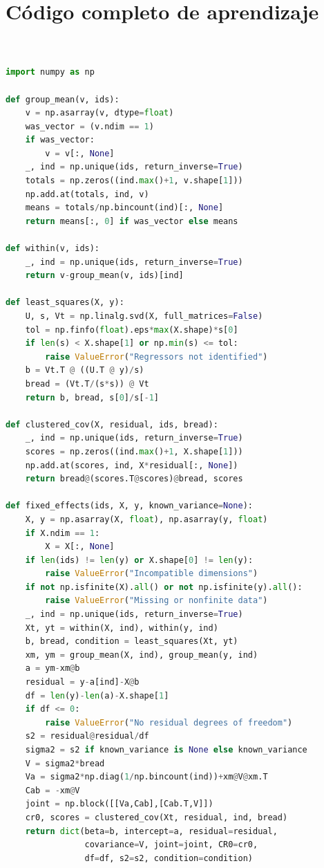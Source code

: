\documentclass[11pt,a4paper]{article}
\theoremstyle{definition}
\begin{document}
\section{Código completo de aprendizaje}
\begin{lstlisting}[language=Python]


import numpy as np

def group_mean(v, ids):
    v = np.asarray(v, dtype=float)
    was_vector = (v.ndim == 1)
    if was_vector:
        v = v[:, None]
    _, ind = np.unique(ids, return_inverse=True)
    totals = np.zeros((ind.max()+1, v.shape[1]))
    np.add.at(totals, ind, v)
    means = totals/np.bincount(ind)[:, None]
    return means[:, 0] if was_vector else means

def within(v, ids):
    _, ind = np.unique(ids, return_inverse=True)
    return v-group_mean(v, ids)[ind]

def least_squares(X, y):
    U, s, Vt = np.linalg.svd(X, full_matrices=False)
    tol = np.finfo(float).eps*max(X.shape)*s[0]
    if len(s) < X.shape[1] or np.min(s) <= tol:
        raise ValueError("Regressors not identified")
    b = Vt.T @ ((U.T @ y)/s)
    bread = (Vt.T/(s*s)) @ Vt
    return b, bread, s[0]/s[-1]

def clustered_cov(X, residual, ids, bread):
    _, ind = np.unique(ids, return_inverse=True)
    scores = np.zeros((ind.max()+1, X.shape[1]))
    np.add.at(scores, ind, X*residual[:, None])
    return bread@(scores.T@scores)@bread, scores

def fixed_effects(ids, X, y, known_variance=None):
    X, y = np.asarray(X, float), np.asarray(y, float)
    if X.ndim == 1:
        X = X[:, None]
    if len(ids) != len(y) or X.shape[0] != len(y):
        raise ValueError("Incompatible dimensions")
    if not np.isfinite(X).all() or not np.isfinite(y).all():
        raise ValueError("Missing or nonfinite data")
    _, ind = np.unique(ids, return_inverse=True)
    Xt, yt = within(X, ind), within(y, ind)
    b, bread, condition = least_squares(Xt, yt)
    xm, ym = group_mean(X, ind), group_mean(y, ind)
    a = ym-xm@b
    residual = y-a[ind]-X@b
    df = len(y)-len(a)-X.shape[1]
    if df <= 0:
        raise ValueError("No residual degrees of freedom")
    s2 = residual@residual/df
    sigma2 = s2 if known_variance is None else known_variance
    V = sigma2*bread
    Va = sigma2*np.diag(1/np.bincount(ind))+xm@V@xm.T
    Cab = -xm@V
    joint = np.block([[Va,Cab],[Cab.T,V]])
    cr0, scores = clustered_cov(Xt, residual, ind, bread)
    return dict(beta=b, intercept=a, residual=residual,
                covariance=V, joint=joint, CR0=cr0,
                df=df, s2=s2, condition=condition)


\end{lstlisting}
\end{document}
